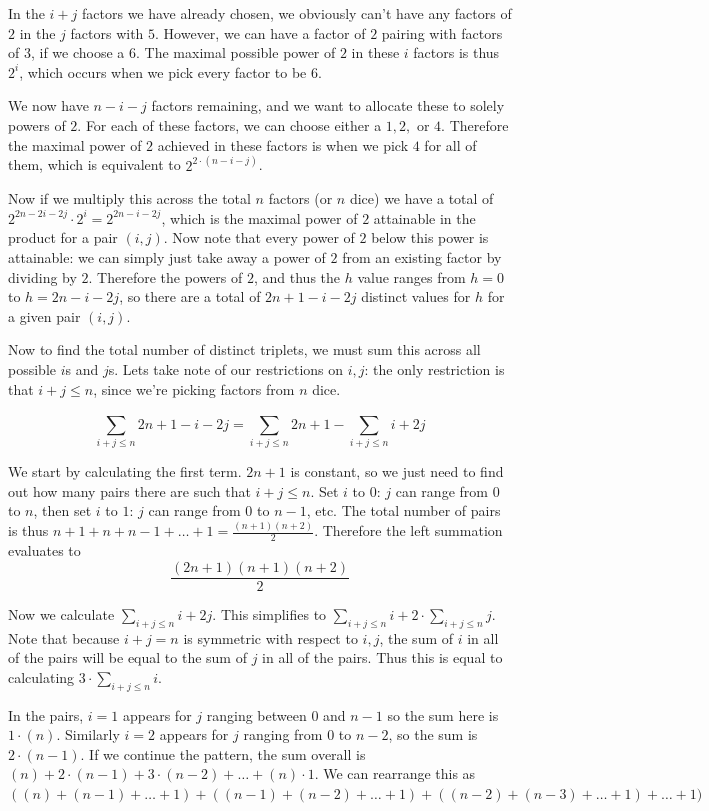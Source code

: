 \begin{enumerate}
 In the $i+j$ factors we have already chosen, we obviously can't have any factors of $2$ in the $j$ factors with $5$. However, we can have a factor of $2$ pairing with factors of $3$, if we choose a $6$. The maximal possible power of $2$ in these $i$ factors is thus $2^i$, which occurs when we pick every factor to be $6$. 

 We now have $n-i-j$ factors remaining, and we want to allocate these to solely powers of $2$. For each of these factors, we can choose either a $1,2,$ or $4$. Therefore the maximal power of $2$ achieved in these factors is when we pick $4$ for all of them, which is equivalent to $2^{2\cdot (n-i-j)}$.

 Now if we multiply this across the total $n$ factors (or $n$ dice) we have a total of $2^{2n-2i-2j} \cdot 2^i = 2^{2n-i-2j}$, which is the maximal power of $2$ attainable in the product for a pair $(i,j)$. Now note that every power of $2$ below this power is attainable: we can simply just take away a power of $2$ from an existing factor by dividing by $2$. Therefore the powers of $2$, and thus the $h$ value ranges from $h=0$ to $h=2n-i-2j$, so there are a total of $2n+1-i-2j$ distinct values for $h$ for a given pair $(i,j)$. 

 Now to find the total number of distinct triplets, we must sum this across all possible $i$s and $j$s. Lets take note of our restrictions on $i,j$: the only restriction is that $i+j \leq n$, since we're picking factors from $n$ dice.

 
 \[\sum_{i+j\leq n}^{} 2n+1-i-2j = \sum_{i+j \leq n}^{} 2n+1 - \sum_{i+j \leq n}^{} i+2j\]

 We start by calculating the first term. $2n+1$ is constant, so we just need to find out how many pairs there are such that $i+j \leq n$. Set $i$ to $0$: $j$ can range from $0$ to $n$, then set $i$ to $1$: $j$ can range from $0$ to $n-1$, etc. The total number of pairs is thus $n+1+n+n-1+\dots+1 = \frac{(n+1)(n+2)}{2}$. Therefore the left summation evaluates to 
 \[\frac{(2n+1)(n+1)(n+2)}{2}\]

 Now we calculate $\sum_{i+j \leq n}^{} i+2j$. This simplifies to $\sum_{i+j \leq n}^{} i + 2 \cdot \sum_{i+j \leq n}^{} j$. Note that because $i+j = n$ is symmetric with respect to $i,j$, the sum of $i$ in all of the pairs will be equal to the sum of $j$ in all of the pairs. Thus this is equal to calculating $3 \cdot \sum_{i+j \leq n}^{} i$.

 In the pairs, $i=1$ appears for $j$ ranging between $0$ and $n-1$ so the sum here is $1 \cdot (n)$. Similarly $i=2$ appears for $j$ ranging from $0$ to $n-2$, so the sum is $2 \cdot (n-1)$. If we continue the pattern, the sum overall is $(n)+2 \cdot (n-1) + 3 \cdot (n-2) + \dots + (n) \cdot 1$. We can rearrange this as $((n)+(n-1)+ \dots + 1) + ((n-1)+(n-2)+ \dots + 1)+ ((n-2)+(n-3)+ \dots + 1) + \dots + 1)$


\end{enumerate}
